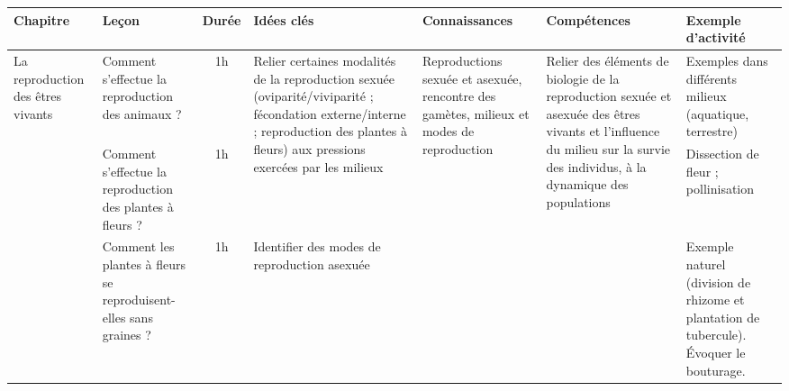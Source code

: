 \documentclass{Progression}
\begin{document}
\noindent
\begin{tabularx}{\linewidth}{p{3cm}p{3cm}cp{6cm}*3{X}}
  \toprule
  \textbf{Chapitre} & \textbf{Leçon} & \textbf{Durée} & \textbf{Idées clés} & \textbf{Connaissances} & \textbf{Compétences} & \textbf{Exemple d'activité} \\  \midrule
  La reproduction des êtres vivants & Comment s’effectue la reproduction des animaux ? & 1h & \multirow{2}{=}{Relier certaines modalités de la reproduction sexuée (oviparité/viviparité ; fécondation externe/interne ; reproduction des plantes à fleurs) aux pressions exercées par les milieux} & \multirow{2}{=}{Reproductions sexuée et asexuée, rencontre des gamètes, milieux et modes de reproduction} & \multirow{2}{=}{Relier des éléments de biologie de la reproduction sexuée et asexuée des êtres vivants et l’influence du milieu sur la survie des individus, à la dynamique des populations} & Exemples dans différents milieux (aquatique, terrestre) \\
  \cmidrule(l){2-3}
  \cmidrule(l){7-7}
  & Comment s’effectue la reproduction des plantes à fleurs ? & 1h & & & & Dissection de fleur ; pollinisation \\
  \cmidrule(l){2-4}
  \cmidrule(l){7-7}
  & Comment les plantes à fleurs se reproduisent-elles sans graines ? & 1h & Identifier des modes de reproduction asexuée & & & Exemple naturel (division de rhizome et plantation de tubercule). Évoquer le bouturage.\\
  \bottomrule
\end{tabularx}
\end{document}
